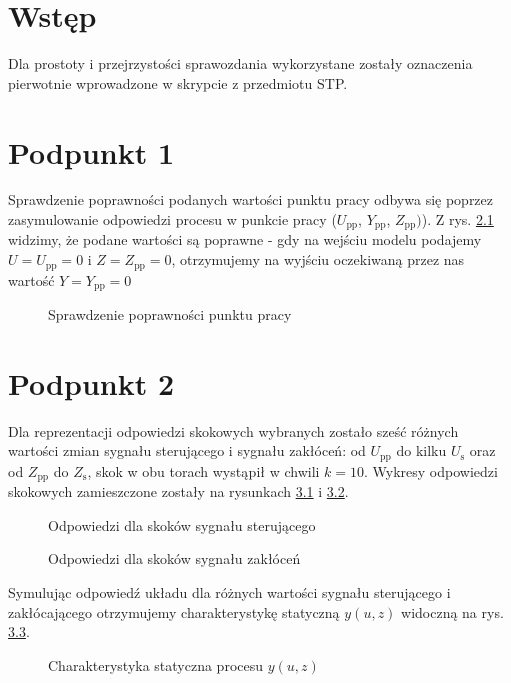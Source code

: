 \chapter{Wstęp}
Dla prostoty i przejrzystości sprawozdania wykorzystane zostały oznaczenia pierwotnie wprowadzone w skrypcie z przedmiotu STP.

\chapter{Podpunkt 1}
Sprawdzenie poprawności podanych wartości punktu pracy odbywa się poprzez zasymulowanie odpowiedzi procesu w punkcie pracy ($U_{\mathrm{pp}}$, $Y_{\mathrm{pp}}$, $Z_{\mathrm{pp}})$). Z rys. \ref{Z1} widzimy, że podane wartości są poprawne - gdy na wejściu modelu podajemy $U=U_{\mathrm{pp}}=0$ i $Z=Z_{\mathrm{pp}}=\num{0}$, otrzymujemy na wyjściu oczekiwaną przez nas wartość $Y=Y_{\mathrm{pp}}=\num{0}$

\begin{figure}[ht]
\centering

\caption{Sprawdzenie poprawności punktu pracy}
\label{Z1}
\end{figure}


\chapter{Podpunkt 2}
Dla reprezentacji odpowiedzi skokowych wybranych zostało sześć różnych wartości zmian sygnału sterującego i sygnału zakłóceń: od $U_{\mathrm{pp}}$ do kilku $U_{\mathrm{s}}$ oraz od $Z_{\mathrm{pp}}$ do  $Z_{\mathrm{s}}$, skok w obu torach wystąpił w chwili $k=10$. Wykresy odpowiedzi skokowych zamieszczone zostały na rysunkach \ref{Z2a} i \ref{Z2b}.

\begin{figure}[ht]
\centering

\caption{Odpowiedzi dla skoków sygnału sterującego} 
\label{Z2a}
\end{figure}

\begin{figure}[ht]
\centering

\caption{Odpowiedzi dla skoków sygnału zakłóceń}
\label{Z2b}
\end{figure}

Symulując odpowiedź układu dla różnych wartości sygnału sterującego i zakłócającego otrzymujemy charakterystykę statyczną $y(u,z)$ widoczną na rys. \ref{Z2c}.

\begin{figure}[ht]
\centering

\caption{Charakterystyka statyczna procesu $y(u,z)$}
\label{Z2c}
\end{figure}



